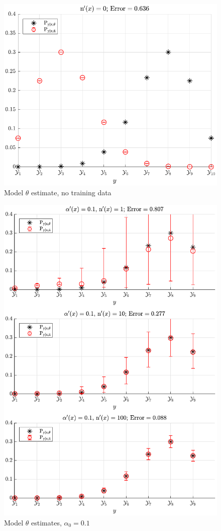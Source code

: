 \documentclass[12pt]{report}
\begin{document}
\begin{figure}
\centering
\includegraphics[scale=1.0]{P_yx_error_N_0.pdf}
\caption{Model $\theta$ estimate, no training data}
\label{fig:P_yx_error_N_0}
\end{figure}

\begin{figure}
\centering
\includegraphics[scale=0.8]{P_yx_error_a0_0_1.pdf}
\caption{Model $\theta$ estimates, $\alpha_0 = 0.1$}
\label{fig:P_yx_error_a0_0_1}
\end{figure}
\end{document}
